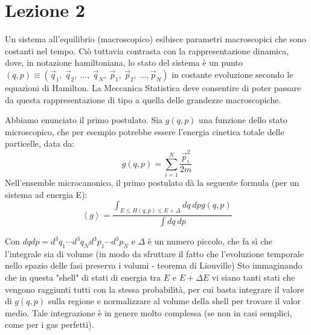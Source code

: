 \documentclass[12pt]{article}
\begin{document}
\section{Lezione 2}%
Un sistema all'equilibrio (macroscopico) esibisce parametri macroscopici che sono costanti nel tempo. Ciò tuttavia contrasta con la rappresentazione dinamica, dove, in notazione hamiltoniana, lo stato del sistema è un punto $\left(q,p\right)\equiv\left({\vec{q}}_1,\ {\vec{q}}_2,\ \ldots,\ {\vec{q}}_N,\ {\vec{p}}_1,\ {\vec{p}}_2,\ \ldots,{\vec{p}}_N\right)$ in costante evoluzione secondo le equazioni di Hamilton. La Meccanica Statistica deve consentire di poter passare da questa rappresentazione di tipo a quella delle grandezze macroscopiche.

Abbiamo enunciato il primo postulato. 
Sia $g(q,p)$ una funzione dello stato microscopico, che per esempio potrebbe essere l'energia cinetica totale delle particelle, data da:
\[
g\left(q,p\right)= \sum_{i=1}^{N}\frac{{\vec{p}}_i^2}{2m}
\]
Nell'ensemble microcanonico, il primo postulato dà la seguente formula (per un sistema ad energia E):
\[
\left\langle g\right\rangle=\frac{\int_{E\le H\left(q,p\right)\le E+\Delta}{dq\ dpg\left(q,p\right)}}{\int{dq\ dp}}
\]

Con $dq dp=d^3q_1\cdots d^3q_N d^3p_1\cdots d^3p_N$ e $\Delta$ è un numero piccolo, che fa sì che l'integrale sia di volume (in modo da sfruttare il fatto che l'evoluzione temporale nello spazio delle fasi preserva i volumi - teorema di Liouville)
Sto immaginando che in questa "shell" di stati di energia tra $E$ e $E+\Delta E$ vi siano tanti stati che vengono raggiunti tutti con la stessa probabilità, per cui basta integrare il valore di $g(q,p)$ sulla regione e normalizzare al volume della shell per trovare il valor medio.
Tale integrazione è in genere molto complessa (se non in casi semplici, come per i gas perfetti). 
\end{document}
